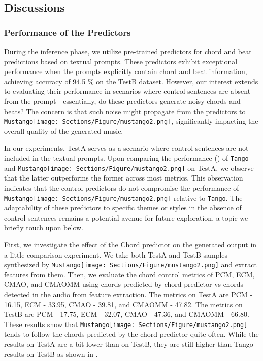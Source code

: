 \documentclass[11pt]{article}
\newcommand{\model}{\texttt{Mustango}}
\newcommand{\modelemoji}{\model{}\texttt{[image: Sections/Figure/mustango2.png]}}
\begin{document}
\subsection{Discussions}














\subsubsection{Performance of the Predictors}
During the inference phase, we utilize pre-trained predictors for chord and beat predictions based on textual prompts. These predictors exhibit exceptional performance when the prompts explicitly contain chord and beat information, achieving accuracy of 94.5 \% on the TestB dataset. However, our interest extends to evaluating their performance in scenarios where control sentences are absent from the prompt—essentially, do these predictors generate noisy chords and beats? The concern is that such noise might propagate from the predictors to \modelemoji{}, significantly impacting the overall quality of the generated music.

In our experiments, TestA serves as a scenario where control sentences are not included in the textual prompts. Upon comparing the performance () of \texttt{Tango} and \modelemoji{} on TestA, we observe that the latter outperforms the former across most metrics. This observation indicates that the control predictors do not compromise the performance of \modelemoji{} relative to \texttt{Tango}. The adaptability of these predictors to specific themes or styles in the absence of control sentences remains a potential avenue for future exploration, a topic we briefly touch upon below.

First, we investigate the effect of the Chord predictor on the generated output in a little comparison experiment. We take both TestA and TestB samples synthesized by \modelemoji{} and extract features from them. Then, we evaluate the chord control metrics of PCM, ECM, CMAO, and CMAOMM using chords predicted by chord predictor vs chords detected in the audio from feature extraction.
The metrics on TestA are PCM - 16.15, ECM - 33.95, CMAO - 39.81, and CMAOMM - 47.82.
The metrics on TestB are PCM - 17.75, ECM - 32.07, CMAO - 47.36, and CMAOMM - 66.80.
These results show that \modelemoji{} tends to follow the chords predicted by the chord predictor quite often. While the results on TestA are a bit lower than on TestB, they are still higher than Tango results on TestB as shown in .
\end{document}
